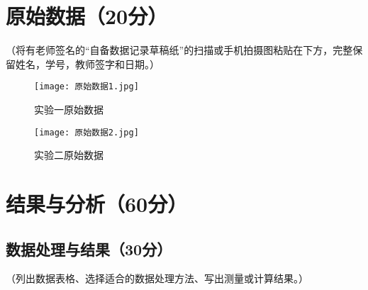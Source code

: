 \documentclass[]{../模板/Report}%
\begin{document}
\begin{fullreportonly}
\section{原始数据（20分）}
（将有老师签名的“自备数据记录草稿纸”的扫描或手机拍摄图粘贴在下方，完整保留姓名，学号，教师签字和日期。）
\begin{figure}[H]
    \centering
    \texttt{[image: 原始数据1.jpg]}
    \caption{实验一原始数据}
\end{figure}

\begin{figure}[H]
    \centering
    \texttt{[image: 原始数据2.jpg]}
    \caption{实验二原始数据}
\end{figure}

\section{结果与分析（60分）}
\subsection{数据处理与结果（30分）}
（列出数据表格、选择适合的数据处理方法、写出测量或计算结果。）

\end{fullreportonly}
\end{document}
